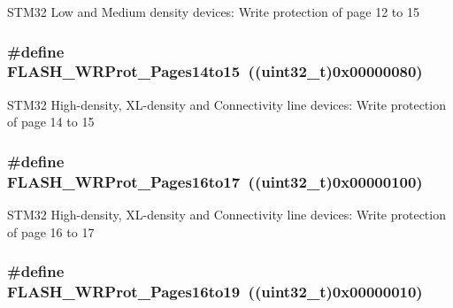 STM32 Low and Medium density devices: Write protection of page 12 to 15 \hypertarget{group__Option__Bytes__Write__Protection_ga5e5fcead35c861e1329c3e4e7e3ffa4e}{
\subsubsection[{FLASH\_\-WRProt\_\-Pages14to15}]{\setlength{\rightskip}{0pt plus 5cm}\#define FLASH\_\-WRProt\_\-Pages14to15~((uint32\_\-t)0x00000080)}}
\label{group__Option__Bytes__Write__Protection_ga5e5fcead35c861e1329c3e4e7e3ffa4e}
STM32 High-\/density, XL-\/density and Connectivity line devices: Write protection of page 14 to 15 \hypertarget{group__Option__Bytes__Write__Protection_ga33deabc2c4a82cfa4a98008082e29ea7}{
\subsubsection[{FLASH\_\-WRProt\_\-Pages16to17}]{\setlength{\rightskip}{0pt plus 5cm}\#define FLASH\_\-WRProt\_\-Pages16to17~((uint32\_\-t)0x00000100)}}
\label{group__Option__Bytes__Write__Protection_ga33deabc2c4a82cfa4a98008082e29ea7}
STM32 High-\/density, XL-\/density and Connectivity line devices: Write protection of page 16 to 17 \hypertarget{group__Option__Bytes__Write__Protection_gaa589ce30909c3a9a0bffc8a59b6013fb}{
\subsubsection[{FLASH\_\-WRProt\_\-Pages16to19}]{\setlength{\rightskip}{0pt plus 5cm}\#define FLASH\_\-WRProt\_\-Pages16to19~((uint32\_\-t)0x00000010)}}
\label{group__Option__Bytes__Write__Protection_gaa589ce30909c3a9a0bffc8a59b6013fb}
